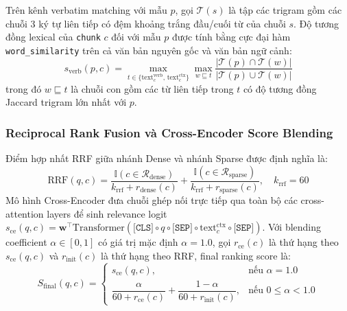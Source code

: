 Trên kênh verbatim matching với mẫu $p$, gọi $\mathcal{T}(s)$ là tập các trigram gồm các chuỗi 3 ký tự liên tiếp có đệm khoảng trắng đầu/cuối từ của chuỗi $s$. Độ tương đồng lexical của \texttt{chunk} $c$ đối với mẫu $p$ được tính bằng cực đại hàm \texttt{word\_similarity} trên cả văn bản nguyên gốc và văn bản ngữ cảnh:
\begin{equation}
    s_{\text{verb}}(p, c) = \max_{t \in \{\text{text}^{\text{verb}}_c,\, \text{text}^{\text{ctx}}_c\}} \max_{w \sqsubseteq t} \frac{|\mathcal{T}(p) \cap \mathcal{T}(w)|}{|\mathcal{T}(p) \cup \mathcal{T}(w)|}
    \label{eq:trigram}
\end{equation}
trong đó $w \sqsubseteq t$ là chuỗi con gồm các từ liên tiếp trong $t$ có độ tương đồng Jaccard trigram lớn nhất với $p$.

\subsubsection{Reciprocal Rank Fusion và Cross-Encoder Score Blending}
Điểm hợp nhất RRF \cite{cormack2009rrf} giữa nhánh Dense và nhánh Sparse được định nghĩa là:
\begin{equation}
    \text{RRF}(q, c) = \frac{\mathbb{I}(c \in \mathcal{R}_{\text{dense}})}{k_{\text{rrf}} + r_{\text{dense}}(c)} + \frac{\mathbb{I}(c \in \mathcal{R}_{\text{sparse}})}{k_{\text{rrf}} + r_{\text{sparse}}(c)}, \quad k_{\text{rrf}} = 60
    \label{eq:rrf}
\end{equation}
Mô hình Cross-Encoder \cite{nogueira2019bert, wang2021minilm} đưa chuỗi ghép nối trực tiếp qua toàn bộ các cross-attention layers để sinh relevance logit $s_{\text{ce}}(q, c) = \mathbf{w}^{\top} \text{Transformer}(\texttt{[CLS]} \circ q \circ \texttt{[SEP]} \circ \text{text}^{\text{ctx}}_c \circ \texttt{[SEP]})$. Với blending coefficient $\alpha \in [0, 1]$ có giá trị mặc định $\alpha = 1.0$, gọi $r_{\text{ce}}(c)$ là thứ hạng theo $s_{\text{ce}}(q, c)$ và $r_{\text{init}}(c)$ là thứ hạng theo RRF, final ranking score là:
\begin{equation}
    S_{\text{final}}(q, c) = \begin{cases}
        s_{\text{ce}}(q, c), & \text{nếu } \alpha = 1.0 \\[4pt]
        \dfrac{\alpha}{60 + r_{\text{ce}}(c)} + \dfrac{1 - \alpha}{60 + r_{\text{init}}(c)}, & \text{nếu } 0 \le \alpha < 1.0
    \end{cases}
    \label{eq:rerank_blend}
\end{equation}

